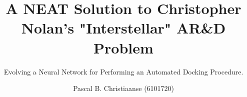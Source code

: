 \documentclass{tudelft-report}
\begin{document}
\frontmatter

\title{A NEAT Solution to Christopher Nolan's "Interstellar" AR\&D Problem
}
\subtitle{Evolving a Neural Network for Performing an Automated Docking Procedure.}
\author{Pascal B. Christiaanse (6101720)} %

\subject{
AE4350: Bio-inspired Intelligence and learning for Aerospace Applications} %

\makecover


% 
% 

\tableofcontents




\mainmatter







\setcounter{biburlnumpenalty}{7000}
\setcounter{biburllcpenalty}{7000}
\setcounter{biburlucpenalty}{7000}

\printbibliography[heading=bibintoc,title=References]


\appendix



\end{document}
